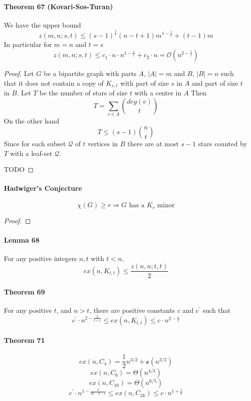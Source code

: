 \paragraph{Theorem 67 (Kovari-Sos-Turan)} We have the upper bound 
$$ z(m,n;s,t) \leq (s - 1)^{\frac{1}{t}}(n-t+1)m^{1-\frac{1}{t}}
+ (t-1)m $$ 
In particular for $ m = n $ and $ t = s $
$$  z(m,n;s,t) \leq c_1 \cdot n \cdot n^{1-\frac{1}{t}} + c_2 \cdot n
= \mathcal{O}(n^{2-\frac{1}{t}}) $$ 
\begin{proof}
    Let $ G $ be a bipartite graph with parts $ A $, $ |A| = m$ and 
    $ B $, $|B| = n $ such that it does not contain a copy of $ K_{s,t} $
    with part of size $ s $ in $ A $ and part of size $ t $ in $ B $.
    Let $ T $ be the number of stars of size $ t $ with a center in $ A $
    Then 
    $$ T = \sum_{v \in A} \binom{deg(v)}{t} $$ 
    On the other hand 
    $$ T \leq (s - 1)\binom{n}{t} $$
    Since for each subset $ \mathcal{Q} $ of $ t $ vertices in $ B $ there 
    are at most $ s-1 $ stars counted by $ T $ with a leaf-set $ \mathcal{Q}$.

    \smallskip TODO
\end{proof}

\paragraph{Hadwiger's Conjecture}
$$  \chi(G) \geq r \Rightarrow G \text{ has  a } K_r \text{ minor}$$
\begin{proof}
    {\color{red}{proof cases $r = 3$ and $r = 4$ for exam}}
\end{proof}

\paragraph{Lemma 68} For any positive integers $ n,t $ with $ t < n$, 
$$ ex(n,K_{t,t}) \leq \frac{z(n,n;t,t)}{2} $$

\paragraph{Theorem 69} For any positive $ t$, and $ n > t $, there are 
positive constants $ c $ and $ c^\prime $ such that 
$$ c^\prime \cdot n^{2 -\frac{2}{t+1}} \leq ex(n,K_{t,t}) \leq c \cdot n^{2 - \frac{1}{t}} $$

\paragraph{Theorem 71} 
$$ ex(n,C_4) = \frac{1}{2}n^{3/2} + \mathcal{o}(n^{3/2}) $$ 
$$ ex(n,C_6) = \Theta(n^{4/3}) $$
$$ ex(n,C_{10}) = \Theta(n^{6/5}) $$ 
$$ c^\prime \cdot n^{1-\frac{2}{3k-2-\epsilon}} \leq 
ex(n,C_{2k}) \leq c \cdot n^{1 + \frac{1}{k}} $$ 

